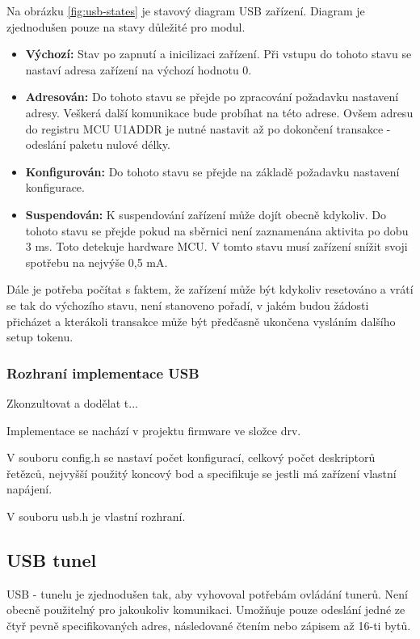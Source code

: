 Na obrázku \ref{fig:usb-states} je stavový diagram USB zařízení. Diagram je zjednodušen pouze na stavy důležité pro modul.
\begin{itemize}
\item \textbf{Výchozí:} Stav po zapnutí a inicilizaci zařízení. Při vstupu do tohoto stavu se nastaví adresa zařízení na výchozí hodnotu 0.
\item \textbf{Adresován:} Do tohoto stavu se přejde po zpracování požadavku nastavení adresy. Veškerá další komunikace bude probíhat na této adrese. Ovšem adresu do registru MCU U1ADDR je nutné nastavit až po dokončení transakce - odeslání paketu nulové délky.
\item \textbf{Konfigurován:} Do tohoto stavu se přejde na základě požadavku nastavení konfigurace. 
\item \textbf{Suspendován:} K suspendování zařízení může dojít obecně kdykoliv. Do tohoto stavu se přejde pokud na sběrnici není zaznamenána aktivita po dobu 3 ms. Toto detekuje hardware MCU. V tomto stavu musí zařízení snížit svoji spotřebu na nejvýše 0,5 mA.
\end{itemize}

Dále je potřeba počítat s faktem, že zařízení může být kdykoliv resetováno a vrátí se tak do výchozího stavu, není stanoveno pořadí, v jakém budou žádosti přicházet a kterákoli transakce může být předčasně ukončena vysláním dalšího setup tokenu. 



\subsubsection{Rozhraní implementace USB}
Zkonzultovat a dodělat t...

Implementace se nachází v projektu firmware ve složce drv.


V souboru config.h se nastaví počet konfigurací, celkový počet deskriptorů řetězců, nejvyšší použitý koncový bod a specifikuje se jestli má zařízení vlastní napájení.

V souboru usb.h je vlastní rozhraní.




\subsection{USB \iic tunel}
USB - \iic tunelu je zjednodušen tak, aby vyhovoval potřebám ovládání tunerů. Není obecně použitelný pro jakoukoliv \iic komunikaci. Umožňuje pouze odeslání jedné ze čtyř pevně specifikovaných adres, následované čtením nebo zápisem až 16-ti bytů.

